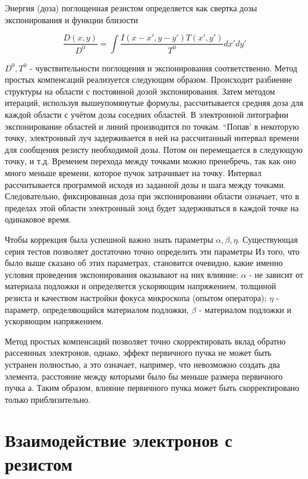 Энергия (доза) поглощенная резистом определяется как свертка дозы экспонирования и функции близости

\begin{equation}
\frac{D(x,y)}{D^0}= \int \frac{I(x-x',y-y')T(x',y')}{T^0} dx' dy'
\label{eq:A9}
\end{equation}

$D^0,T^0$ - чувствительности поглощения и экспонирования соответственно.
Метод простых компенсаций реализуется следующим образом. Происходит разбиение структуры на области с постоянной дозой экспонирования. Затем методом итераций, используя вышеупомянутые формулы, рассчитывается средняя доза для каждой области с учётом дозы соседних областей. В электронной литографии экспонирование областей и линий производится по точкам. “Попав’ в некоторую точку, электронный луч задерживается в ней на рассчитанный интервал времени для сообщения резисту необходимой дозы. Потом он перемещается в следующую точку, и т.д. Временем перехода между точками можно пренебречь, так как оно много меньше времени, которое пучок затрачивает на точку. Интервал рассчитывается программой исходя из заданной дозы и шага между точками. Следовательно, фиксированная доза при экспонировании области означает, что в пределах этой области электронный зонд будет задерживаться в каждой точке на одинаковое время.

Чтобы коррекция была успешной важно знать параметры $\alpha,\beta,\eta$. Существующая серия тестов позволяет достаточно точно определить эти параметры Из того, что было выше сказано об этих параметрах, становится очевидно, какие именно условия проведения экспонирования оказывают на них влияние: $\alpha$ - не зависит от материала подложки и определяется ускоряющим напряжением, толщиной резиста и качеством настройки фокуса микроскопа (опытом оператора); $\eta$ - параметр, определяющийся материалом подложки, $\beta$ - материалом подложки и ускоряющим напряжением.

Метод простых компенсаций позволяет точно скорректировать вклад обратно рассеянных электронов, однако, эффект первичного пучка не может быть устранен полностью, а это означает, например, что невозможно создать два элемента, расстояние между которыми было бы меньше размера первичного пучка а. Таким образом, влияние первичного пучка может быть скорректировано только приблизительно.

\section{Взаимодействие электронов с резистом}

